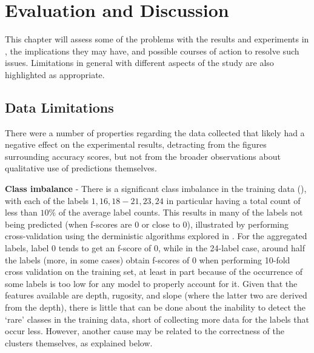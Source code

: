 \chapter{Evaluation and Discussion} \label{chap:evaluation}

This chapter will assess some of the problems with the results and experiments in , the implications they may have, and possible courses of action to resolve such issues. Limitations in general with different aspects of the study are also highlighted as appropriate.

\section{Data Limitations}
There were a number of properties regarding the data collected that likely had a negative effect on the experimental results, detracting from the figures surrounding accuracy scores, but not from the broader observations about qualitative use of predictions themselves.

\textbf{Class imbalance} -  There is a significant class imbalance in the training data (), with each of the labels $1, 16, 18-21, 23, 24$ in particular having a total count of less than $10\%$ of the average label counts. This results in many of the labels not being predicted (when f-scores are $0$ or close to $0$), illustrated by performing cross-validation using the derministic algorithms explored in . For the aggregated labels, label $0$ tends to get an f-score of 0, while in the 24-label case, around half the labels (more, in some cases) obtain f-scores of $0$ when performing 10-fold cross validation on the training set, at least in part because of the occurrence of some labels is too low for any model to properly account for it. Given that the features available are depth, rugosity, and slope (where the latter two are derived from the depth), there is little that can be done about the inability to detect the `rare' classes in the training data, short of collecting more data for the labels that occur less. However, another cause may be related to the correctness of the clusters themselves, as explained below.



